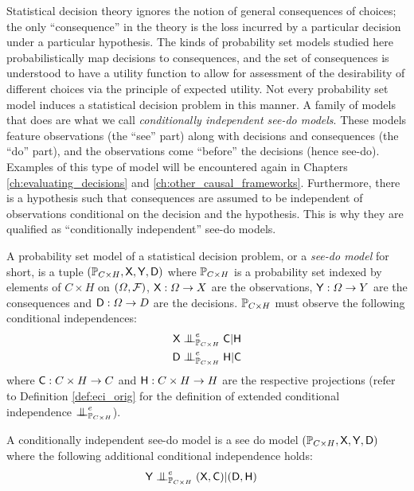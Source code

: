Statistical decision theory ignores the notion of general consequences of choices; the only ``consequence'' in the theory is the loss incurred by a particular decision under a particular hypothesis. The kinds of probability set models studied here probabilistically map decisions to consequences, and the set of consequences is understood to have a utility function to allow for assessment of the desirability of different choices via the principle of expected utility. Not every probability set model induces a statistical decision problem in this manner. A family of models that does are what we call \emph{conditionally independent see-do models}. These models feature observations (the ``see'' part) along with decisions and consequences (the ``do'' part), and the observations come ``before'' the decisions (hence see-do). Examples of this type of model will be encountered again in Chapters \ref{ch:evaluating_decisions} and \ref{ch:other_causal_frameworks}. Furthermore, there is a hypothesis such that consequences are assumed to be independent of observations conditional on the decision and the hypothesis. This is why they are qualified as ``conditionally independent'' see-do models.
\begin{definition}\label{def:see_do_model}
A probability set model of a statistical decision problem, or a \emph{see-do model} for short, is a tuple $(\mathbb{P}_{C\times H}, \mathsf{X},\mathsf{Y},\mathsf{D})$ where $\mathbb{P}_{C\times H}$ is a probability set indexed by elements of $C\times H$ on $(\Omega,\mathcal{F})$, $\mathsf{X}:\Omega\to X$ are the observations, $\mathsf{Y}:\Omega\to Y$ are the consequences and $\mathsf{D}:\Omega\to D$ are the decisions. $\mathbb{P}_{C\times H}$ must observe the following conditional independences:
\begin{align}
    \RV{X}&\CI^e_{\prob{P}_{C\times H}} \RV{C}|\RV{H}\\
    \RV{D}&\CI^e_{\prob{P}_{C\times H}} \RV{H}|\RV{C}
\end{align}
where $\mathsf{C}:C\times H\to C$ and $\mathsf{H}:C\times H\to H$ are the respective projections (refer to Definition \ref{def:eci_orig} for the definition of extended conditional independence $\CI_{\prob{P}_{C\times H}}^e$).
\end{definition}
\begin{definition}\label{def:ci_see_do_model}
A conditionally independent see-do model is a see do model $(\mathbb{P}_{C\times H}, \mathsf{X},\mathsf{Y},\mathsf{D})$ where the following additional conditional independence holds:
\begin{align}
    \RV{Y}&\CI^e_{\prob{P}_{C\times H}} (\RV{X,C})|(\RV{D},\RV{H})
\end{align}
\end{definition}
